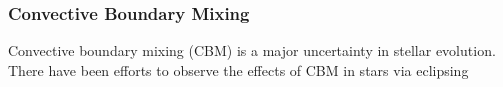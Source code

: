 {\color{purple}
\subsubsection{Convective Boundary Mixing}
}

Convective boundary mixing (CBM) is a major uncertainty in stellar evolution. There have been efforts to observe the effects of CBM in stars via eclipsing 

